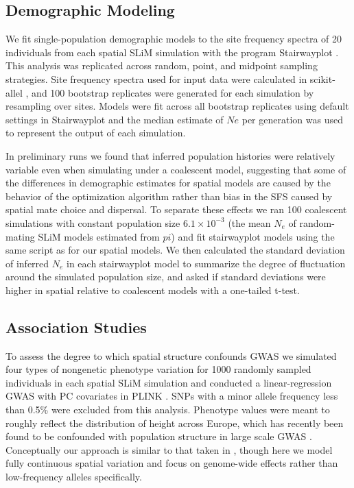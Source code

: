 \documentclass[9pt,twocolumn,twoside,lineno]{gsajnl}
\begin{document}
\subsection{Demographic Modeling}
We fit single-population demographic models to the site frequency spectra of 20 individuals from each spatial SLiM simulation with the program Stairwayplot \citep{Liu2015}. This analysis was replicated across random, point, and midpoint sampling strategies. Site frequency spectra used for input data were calculated in scikit-allel \citep{Miles2017}, and 100 bootstrap replicates were generated for each simulation by resampling over sites. Models were fit across all bootstrap replicates using default settings in Stairwayplot and the median estimate of $Ne$ per generation was used to represent the output of each simulation.

In preliminary runs we found that inferred population histories were relatively variable even when simulating under a coalescent model, suggesting that some of the differences in demographic estimates for spatial models are caused by the behavior of the optimization algorithm rather than bias in the SFS caused by spatial mate choice and dispersal. To separate these effects we ran 100 coalescent simulations with constant population size $6.1\times 10^{-3}$ (the mean $N_{e}$ of random-mating SLiM models estimated from $pi$) and fit stairwayplot models using the same script as for our spatial models. We then calculated the standard deviation of inferred $N_{e}$ in each stairwayplot model to summarize the degree of fluctuation around the simulated population size, and asked if standard deviations were higher in spatial relative to coalescent models with a one-tailed t-test.

\subsection{Association Studies}
To assess the degree to which spatial structure confounds GWAS we simulated four types of nongenetic phenotype variation for 1000 randomly sampled individuals in each spatial SLiM simulation and conducted a linear-regression GWAS with PC covariates in PLINK \citep{PURCELL2007}. SNPs with a minor allele frequency less than 0.5\% were excluded from this analysis. Phenotype values were meant to roughly reflect the distribution of height across Europe, which has recently been found to be confounded with population structure in large scale GWAS \citep{Berg2018,Sohail2018}. Conceptually our approach is similar to that taken in \citep{Mathieson2012}, though here we model fully continuous spatial variation and focus on genome-wide effects rather than low-frequency alleles specifically. 
\end{document}
